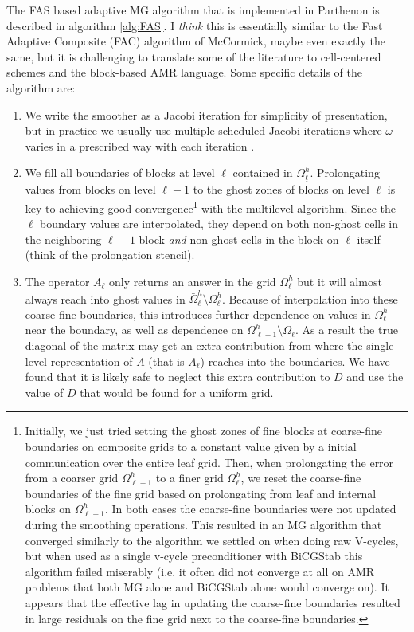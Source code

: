 \documentclass{article}
\begin{document}
The FAS based adaptive MG algorithm that is implemented in Parthenon is described in algorithm \ref{alg:FAS}. I {\it think} this is essentially similar to the Fast Adaptive Composite (FAC) algorithm of McCormick, maybe even exactly the same, but it is challenging to translate some of the literature to cell-centered schemes and the block-based AMR language. Some specific details of the algorithm are:
\begin{enumerate}
    \item\label{proc:jacobi} We write the smoother as a Jacobi iteration for simplicity of presentation, but in practice we usually use multiple scheduled Jacobi iterations where $\omega$ varies in a prescribed way with each iteration \cite{Yang:2017}. 
    \item\label{step:composite_boundary_communication} We fill all boundaries of blocks at level $\ell$ contained in $\Omega^h_{\underline \ell}$. Prolongating values from blocks on level $\ell - 1$ to the ghost zones of blocks on level $\ell$ is key to achieving good convergence\footnote{Initially, we just tried setting the ghost zones of fine blocks at coarse-fine boundaries on composite grids to a constant value given by a initial communication over the entire leaf grid. Then, when prolongating the error from a coarser grid $\Omega^h_{\ell-1}$ to a finer grid $\Omega^h_\ell$, we reset the coarse-fine boundaries of the fine grid based on prolongating from leaf and internal blocks on $\Omega^h_{\ell-1}$. In both cases the coarse-fine boundaries were not updated during the smoothing operations. This resulted in an MG algorithm that converged similarly to the algorithm we settled on when doing raw V-cycles, but when used as a single v-cycle preconditioner with BiCGStab this algorithm failed miserably (i.e. it often did not converge at all on AMR problems that both MG alone and BiCGStab alone would converge on). It appears that the effective lag in updating the coarse-fine boundaries resulted in large residuals on the fine grid next to the coarse-fine boundaries.} with the multilevel algorithm. Since the $\ell$ boundary values are interpolated, they depend on both non-ghost cells in the neighboring $\ell - 1$ block {\it and} non-ghost cells in the block on $\ell$ itself (think of the prolongation stencil).  
    \item\label{step:smooth_matmult} The operator $A_\ell$ only returns an answer in the grid $\Omega^h_\ell$ but it will almost always reach into ghost values in $\bar \Omega^h_\ell \setminus \Omega^h_\ell$. Because of interpolation into these coarse-fine boundaries, this introduces further dependence on values in $\Omega^h_\ell$ near the boundary, as well as dependence on $\Omega^h_{\ell-1} \setminus \Omega_\ell$. As a result the true diagonal of the matrix may get an extra contribution from where the single level representation of $A$ (that is $A_\ell$) reaches into the boundaries. We have found that it is likely safe to neglect this extra contribution to $D$ and use the value of $D$ that would be found for a uniform grid.

\end{enumerate}
\end{document}
